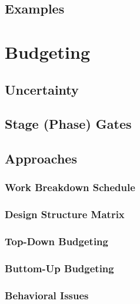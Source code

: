 	\section{Examples} %

\chapter{Budgeting} %

	\section{Uncertainty} %

	\section{Stage (Phase) Gates } %

	\section{Approaches} %

		\subsection{Work Breakdown Schedule} %

		\subsection{Design Structure Matrix} %

		\subsection{Top-Down Budgeting} %

		\subsection{Buttom-Up Budgeting} %

		\subsection{Behavioral Issues} %

